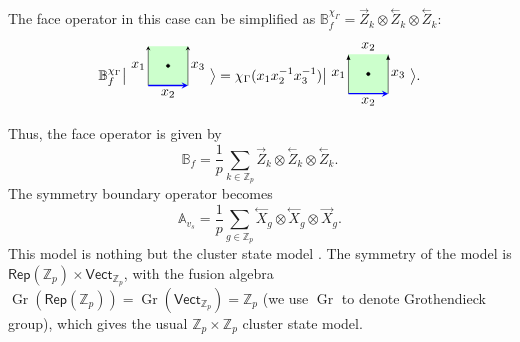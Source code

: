 \documentclass[a4paper,11pt]{article}
\theoremstyle{theorem}
\theoremstyle{remark}
\newcommand{\Av}{\mathbb{A}}
\newcommand{\Bf}{\mathbb{B}}
\newcommand{\Rep}{\mathsf{Rep}}
\newcommand{\XR}{\overset{\rightarrow}{X}}
\newcommand{\XL}{\overset{\leftarrow}{X}}
\newcommand{\ZR}{\overset{\rightarrow}{Z}}
\newcommand{\ZL}{\overset{\leftarrow}{Z}}
\newcommand{\Vect}{\mathsf{Vect}}
\begin{document}
The face operator in this case can be simplified as  $\Bf_f^{\chi_{\Gamma}}= \ZR_{k}\otimes \ZL_{k} \otimes \ZL_{k}$:
\begin{equation}\label{eq:Bf}
	\Bf_f^{\chi_{\Gamma}}
	\big{|}	\begin{aligned}
		\begin{tikzpicture}
                    \fill[green!20] (-0.5, -0.5) rectangle ++(1,1); %
		\draw[-stealth,black] (-0.5,-0.5) -- (-0.5,0.5); 
		\draw[-stealth,black] (0.5,-0.5) -- (0.5,0.5); 
		\draw[-stealth, line width=1.0pt,blue, midway] (-0.5,-0.5) -- (0.5,-0.5); 
			\draw [fill = black] (0,0) circle (1.2pt);
			\node[ line width=0.2pt, dashed, draw opacity=0.5] (a) at (0.75,0){$x_3$};
			\node[ line width=0.2pt, dashed, draw opacity=0.5] (a) at (-0.75,0){$x_1$};
			\node[ line width=0.2pt, dashed, draw opacity=0.5] (a) at (0,-0.7){$x_2$};
		\end{tikzpicture}
	\end{aligned}   \big{ \rangle}     
	= 
	\chi_{\Gamma}(x_1x_2^{-1}x_3^{-1})
	\big{|}	\begin{aligned}
	\begin{tikzpicture}
            \fill[green!20] (-0.5, -0.5) rectangle ++(1,1); %
		\draw[-latex,black] (-0.5,-0.5) -- (-0.5,0.5); 
		\draw[-latex,black] (0.5,-0.5) -- (0.5,0.5); 
		\draw[-stealth, line width=1.0pt,blue, midway] (-0.5,-0.5) -- (0.5,-0.5); 
		\draw [fill = black] (0,0) circle (1.2pt);
		\node[ line width=0.2pt, dashed, draw opacity=0.5] (a) at (0.75,0){$x_3$};
		\node[ line width=0.2pt, dashed, draw opacity=0.5] (a) at (-0.75,0){$x_1$};
		\node[ line width=0.2pt, dashed, draw opacity=0.5] (a) at (0,-0.7){$x_2$};
		\node[ line width=0.2pt, dashed, draw opacity=0.5] (a) at (0,0.7){$x_2$};
	\end{tikzpicture}
\end{aligned}   \big{ \rangle} .
\end{equation}
Thus, the face operator  is given by
\[
\Bf_f = \frac{1}{p} \sum_{k \in \mathbb{Z}_p} \ZR_k \otimes \ZL_k \otimes \ZL_k.
\]
The symmetry boundary operator becomes
\[
\Av_{v_s} = \frac{1}{p} \sum_{g \in \mathbb{Z}_p} \XL_g \otimes \XL_g \otimes \XR_g.
\]
This model is nothing but the cluster state model \cite{jia2024generalized, fechisin2023noninvertible, brell2015generalized}.
The symmetry of the model is \(\Rep(\mathbb{Z}_p) \times \Vect_{\mathbb{Z}_p}\), with the fusion algebra \(\operatorname{Gr}(\Rep(\mathbb{Z}_p)) = \operatorname{Gr}(\Vect_{\mathbb{Z}_p}) = \mathbb{Z}_p \) (we use $\operatorname{Gr}$ to denote Grothendieck group), which gives the usual \(\mathbb{Z}_p \times \mathbb{Z}_p\) cluster state model.
\end{document}
